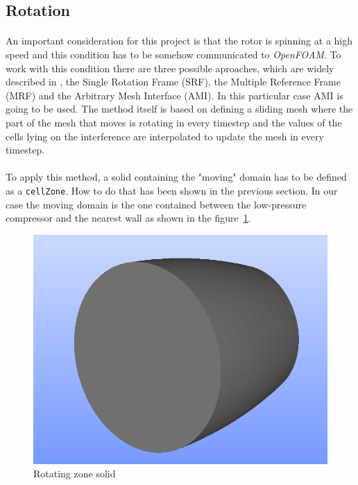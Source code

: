 \subsection{Rotation}
\paragraph{}An important consideration for this project is that the rotor is spinning at a high speed and this condition has to be somehow communicated to \textit{OpenFOAM}. To work with this condition there are three possible aproaches, which are widely described in \cite{Nozaki9240}, the Single Rotation Frame (SRF), the Multiple Reference Frame (MRF) and the Arbitrary Mesh Interface (AMI). In this particular case AMI is going to be used. The method itself is based on defining a sliding mesh where the part of the mesh that moves is rotating in every timestep and the values of the cells lying on the interference are interpolated to update the mesh in every timestep. 

\paragraph{}To apply this method, a solid containing the "moving" domain has to be defined as a \texttt{cellZone}. How to do that has been shown in the previous section. In our case the moving domain is the one contained between the low-pressure compressor and the nearest wall as shown in the figure~\ref{AMI}. 

\begin{figure}[h!]
\centering
\includegraphics[scale=0.45]{./img/AMI.png}
\caption{Rotating zone solid}
\label{AMI}
\end{figure}

